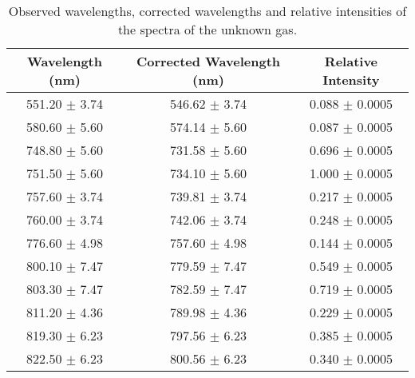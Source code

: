 \begin{table}
    \begin{adjustbox}{width=0.7\textwidth, center}
        \begin{tabular}{|c|c|c|}
            \hline
            Wavelength (nm)   & Corrected Wavelength (nm) & Relative Intensity  \\
            \hline
            551.20 $\pm$ 3.74 & 546.62 $\pm$ 3.74         & 0.088  $\pm$ 0.0005 \\
            580.60 $\pm$ 5.60 & 574.14 $\pm$ 5.60         & 0.087  $\pm$ 0.0005 \\
            748.80 $\pm$ 5.60 & 731.58 $\pm$ 5.60         & 0.696  $\pm$ 0.0005 \\
            751.50 $\pm$ 5.60 & 734.10 $\pm$ 5.60         & 1.000  $\pm$ 0.0005 \\
            757.60 $\pm$ 3.74 & 739.81 $\pm$ 3.74         & 0.217  $\pm$ 0.0005 \\
            760.00 $\pm$ 3.74 & 742.06 $\pm$ 3.74         & 0.248  $\pm$ 0.0005 \\
            776.60 $\pm$ 4.98 & 757.60 $\pm$ 4.98         & 0.144  $\pm$ 0.0005 \\
            800.10 $\pm$ 7.47 & 779.59 $\pm$ 7.47         & 0.549  $\pm$ 0.0005 \\
            803.30 $\pm$ 7.47 & 782.59 $\pm$ 7.47         & 0.719  $\pm$ 0.0005 \\
            811.20 $\pm$ 4.36 & 789.98 $\pm$ 4.36         & 0.229  $\pm$ 0.0005 \\
            819.30 $\pm$ 6.23 & 797.56 $\pm$ 6.23         & 0.385  $\pm$ 0.0005 \\
            822.50 $\pm$ 6.23 & 800.56 $\pm$ 6.23         & 0.340  $\pm$ 0.0005 \\
            \hline
        \end{tabular}
    \end{adjustbox}
    \caption{Observed wavelengths, corrected wavelengths and relative intensities of the spectra of the unknown gas.}
    \label{tab:unknown}
\end{table}
